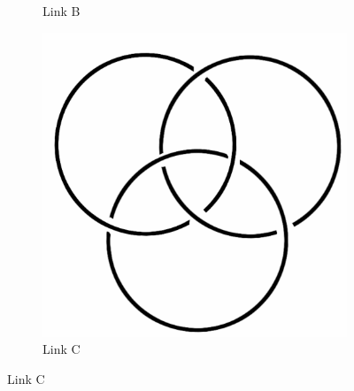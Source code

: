 \documentclass[12pt,letterpaper]{article}
\theoremstyle{definition}
\begin{document}
\begin{figure}[h]
\begin{subfigure}{.3\textwidth}
        \caption{Link B}
    \end{subfigure}
    \quad
    \begin{subfigure}{.3\textwidth}
        \centering
        \includegraphics[width=\textwidth]{meeting11pics/borromean.png}
        \caption{Link C}
    \end{subfigure}
    

\end{figure}
\end{document}
